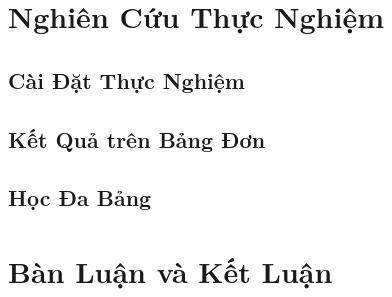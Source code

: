 \documentclass{article}
\begin{document}
\section{Nghiên Cứu Thực Nghiệm}
\subsection{Cài Đặt Thực Nghiệm}

\subsection{Kết Quả trên Bảng Đơn}

\subsection{Học Đa Bảng}

\section{Bàn Luận và Kết Luận}

\end{document}
